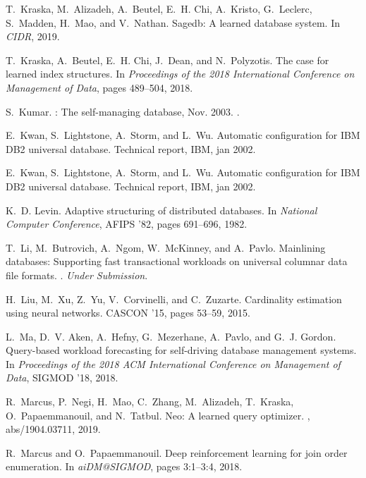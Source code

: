 \documentclass[11pt,times]{article}
\begin{document}
\begin{thebibliography}{10}
T.~Kraska, M.~Alizadeh, A.~Beutel, E.~H. Chi, A.~Kristo, G.~Leclerc, S.~Madden,
  H.~Mao, and V.~Nathan.
\newblock Sagedb: {A} learned database system.
\newblock In {\em CIDR}, 2019.

T.~Kraska, A.~Beutel, E.~H. Chi, J.~Dean, and N.~Polyzotis.
\newblock The case for learned index structures.
\newblock In {\em Proceedings of the 2018 International Conference on
  Management of Data}, pages 489--504, 2018.

S.~Kumar.
: The self-managing database, Nov. 2003.
.

E.~Kwan, S.~Lightstone, A.~Storm, and L.~Wu.
\newblock Automatic configuration for {IBM DB2} universal database.
\newblock Technical report, IBM, jan 2002.

E.~Kwan, S.~Lightstone, A.~Storm, and L.~Wu.
\newblock Automatic configuration for {IBM DB2} universal database.
\newblock Technical report, IBM, jan 2002.

K.~D. Levin.
\newblock Adaptive structuring of distributed databases.
\newblock In {\em National Computer Conference}, AFIPS '82, pages 691--696,
  1982.

T.~Li, M.~Butrovich, A.~Ngom, W.~McKinney, and A.~Pavlo.
\newblock Mainlining databases: Supporting fast transactional workloads on
  universal columnar data file formats.
.
\newblock \textit{Under Submission}.

H.~Liu, M.~Xu, Z.~Yu, V.~Corvinelli, and C.~Zuzarte.
\newblock Cardinality estimation using neural networks.
\newblock CASCON '15, pages 53--59, 2015.

L.~Ma, D.~V. Aken, A.~Hefny, G.~Mezerhane, A.~Pavlo, and G.~J. Gordon.
\newblock Query-based workload forecasting for self-driving database management
  systems.
\newblock In {\em Proceedings of the 2018 ACM International Conference on
  Management of Data}, SIGMOD '18, 2018.

R.~Marcus, P.~Negi, H.~Mao, C.~Zhang, M.~Alizadeh, T.~Kraska, O.~Papaemmanouil,
  and N.~Tatbul.
\newblock Neo: {A} learned query optimizer.
, abs/1904.03711, 2019.

R.~Marcus and O.~Papaemmanouil.
\newblock Deep reinforcement learning for join order enumeration.
\newblock In {\em aiDM@SIGMOD}, pages 3:1--3:4, 2018.


\end{thebibliography}
\end{document}
